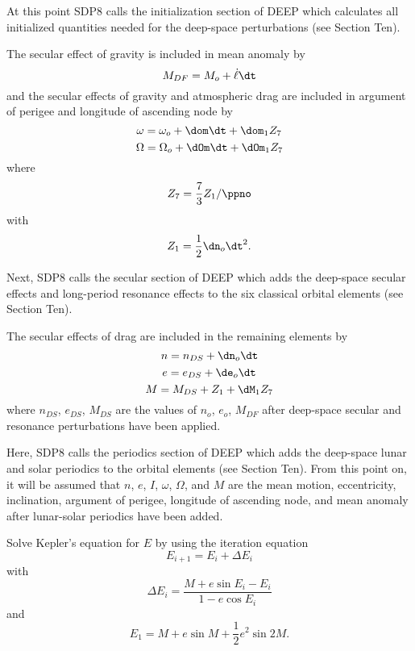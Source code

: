 At this point SDP8 calls the initialization section of DEEP which calculates all
initialized quantities needed for the deep-space perturbations (see Section
Ten).

The secular effect of gravity is included in mean anomaly by
\[M_{DF}=M_o+\dot\ell\dt\]
and the secular effects of gravity and atmospheric drag are included in
argument of perigee and longitude of ascending node by
\[\omega=\omega_o+\dom\dt+\dom_1Z_7\]
\[\Omega=\Omega_o+\dOm\dt+\dOm_1Z_7\]
where
\[Z_7=\dfrac73Z_1/\ppno\]
with
\[Z_1=\dfrac12\dn_o\dt^2.\]

Next, SDP8 calls the secular section of DEEP which adds the deep-space secular
effects and long-period resonance effects to the six classical orbital elements
(see Section Ten).

The secular effects of drag are included in the remaining elements by
\[n=n_{DS}+\dn_o\dt\]
\[e=e_{DS}+\de_o\dt\]
\[M=M_{DS}+Z_1+\dM_1Z_7\]
where $n_{DS}$, $e_{DS}$, $M_{DS}$ are the values of $n_o$, $e_o$, $M_{DF}$
after deep-space secular and resonance perturbations have been applied.

Here, SDP8 calls the periodics section of DEEP which adds the deep-space lunar
and solar periodics to the orbital elements (see Section Ten).  From this point
on, it will be assumed that $n$, $e$, $I$, $\omega$, $\Omega$, and $M$ are the
mean motion, eccentricity, inclination, argument of perigee, longitude of
ascending node, and mean anomaly after lunar-solar periodics have been added.

Solve Kepler's equation for $E$ by using the iteration equation
\[E_{i+1}=E_i+\Delta E_i\]
with
\[\Delta E_i=\dfrac{M+e\sin E_i-E_i}{1-e\cos E_i}\]
and
\[E_1=M+e\sin M+\dfrac12e^2\sin 2M.\]

